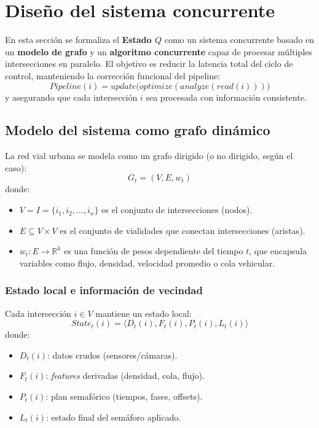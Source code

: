 \documentclass[12pt]{article}
\begin{document}
\section{Diseño del sistema concurrente}

En esta sección se formaliza el \textbf{Estado \(Q\)} como un sistema concurrente basado en un \textbf{modelo de grafo} y un \textbf{algoritmo concurrente} capaz de procesar múltiples intersecciones en paralelo. El objetivo es reducir la latencia total del ciclo de control, manteniendo la corrección funcional del pipeline:
\[
Pipeline(i)= update\big(optimize(analyze(read(i)))\big)
\]
y asegurando que cada intersección \(i\) sea procesada con información consistente.

\subsection{Modelo del sistema como grafo dinámico}

La red vial urbana se modela como un grafo dirigido (o no dirigido, según el caso):
\[
G_t = (V, E, w_t)
\]
donde:
\begin{itemize}
\item \(V = I = \{i_1,i_2,\dots,i_n\}\) es el conjunto de intersecciones (nodos).
\item \(E \subseteq V \times V\) es el conjunto de vialidades que conectan intersecciones (aristas).
\item \(w_t: E \rightarrow \mathbb{R}^k\) es una función de pesos dependiente del tiempo \(t\), que encapsula variables como flujo, densidad, velocidad promedio o cola vehicular.
\end{itemize}

\subsubsection{Estado local e información de vecindad}

Cada intersección \(i \in V\) mantiene un estado local:
\[
State_t(i) = \langle D_t(i), F_t(i), P_t(i), L_t(i)\rangle
\]
donde:
\begin{itemize}
\item \(D_t(i)\): datos crudos (sensores/cámaras).
\item \(F_t(i)\): \textit{features} derivadas (densidad, cola, flujo).
\item \(P_t(i)\): plan semafórico (tiempos, fases, offsets).
\item \(L_t(i)\): estado final del semáforo aplicado.
\end{itemize}
\end{document}
